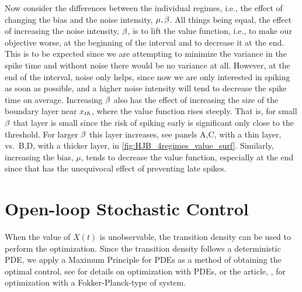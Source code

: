 Now consider the differences between the individual regimes, i.e., the
effect of changing the bias and the noise intensity, ${\mu },\beta$. All things being
equal, the effect of increasing the noise intensity, $\beta$, is to lift the value
function, i.e., to make our objective worse, at the beginning of the interval
and to decrease it at the end. This is to be expected since we are attempting to
minimize the variance in the spike time and without noise there would be no
variance at all. However, at the end of the interval, noise only helps, since
now we are only interested in spiking as soon as possible, and a higher noise
intensity will tend to decrease the spike time on average. Increasing $\beta$ also
has the effect of increasing the size of the boundary layer near ${ x_{th} }$, where
the value function rises steeply. That is, for small $\beta$ that layer is
small since the risk of spiking early is significant only close to the
threshold. For larger $\beta$ this layer increases, see panels A,C, with a thin layer, vs.\ B,D, with a
thicker layer, in \cref{fig:HJB_4regimes_value_surf}. Similarly,
increasing the bias, $\mu$, tends to decrease the value function, especially at
the end since that has the unequivocal effect of preventing late spikes.

 
\section{Open-loop Stochastic Control}
When the value of $X(t)$ is unobservable, the transition density can be used to
perform the optimization. Since the transition density follows a deterministic
PDE, we apply a Maximum Principle for PDEs as a method of obtaining the optimal
control, see \cite{Borzi2012} for details on optimization with PDEs, or the
article, \cite{Annunziato2010}, for optimization with a
Fokker-Planck-type of system.

